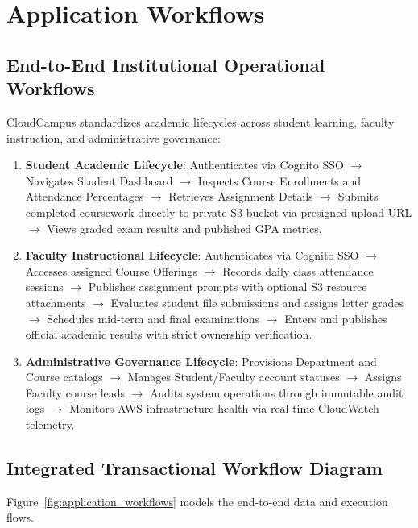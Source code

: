 \newpage
\section{Application Workflows}

\subsection{End-to-End Institutional Operational Workflows}
CloudCampus standardizes academic lifecycles across student learning, faculty instruction, and administrative governance:

\begin{enumerate}[leftmargin=*,itemsep=1pt]
    \item \textbf{Student Academic Lifecycle}: Authenticates via Cognito SSO $\rightarrow$ Navigates Student Dashboard $\rightarrow$ Inspects Course Enrollments and Attendance Percentages $\rightarrow$ Retrieves Assignment Details $\rightarrow$ Submits completed coursework directly to private S3 bucket via presigned upload URL $\rightarrow$ Views graded exam results and published GPA metrics.
    \item \textbf{Faculty Instructional Lifecycle}: Authenticates via Cognito SSO $\rightarrow$ Accesses assigned Course Offerings $\rightarrow$ Records daily class attendance sessions $\rightarrow$ Publishes assignment prompts with optional S3 resource attachments $\rightarrow$ Evaluates student file submissions and assigns letter grades $\rightarrow$ Schedules mid-term and final examinations $\rightarrow$ Enters and publishes official academic results with strict ownership verification.
    \item \textbf{Administrative Governance Lifecycle}: Provisions Department and Course catalogs $\rightarrow$ Manages Student/Faculty account statuses $\rightarrow$ Assigns Faculty course leads $\rightarrow$ Audits system operations through immutable audit logs $\rightarrow$ Monitors AWS infrastructure health via real-time CloudWatch telemetry.
\end{enumerate}

\subsection{Integrated Transactional Workflow Diagram}
Figure~\ref{fig:application_workflows} models the end-to-end data and execution flows.

